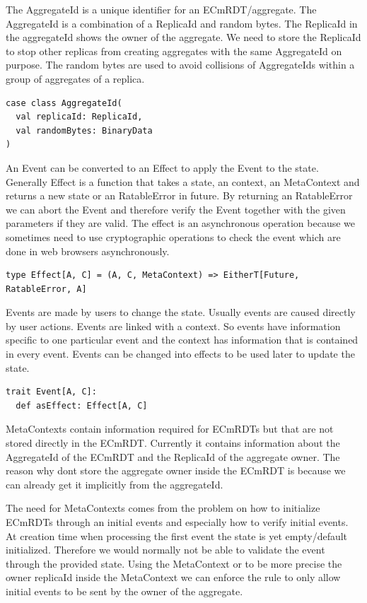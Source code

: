 \documentclass[
	ngerman,
	ruledheaders=section,   %
	class=report,		    %
	thesis={type=bachelor}, %
	accentcolor=9c,			%
	custommargins=true,    %
	marginpar=false,        %
	parskip=half-,          %
	fontsize=11pt,          %
]{tudapub}
\begin{document}
The AggregateId is a unique identifier for an ECmRDT/aggregate. The AggregateId is a combination of a ReplicaId and random bytes. The ReplicaId in the aggregateId shows the owner of the aggregate. We need to store the ReplicaId to stop other replicas from creating aggregates with the same AggregateId on purpose. The random bytes are used to avoid collisions of AggregateIds within a group of aggregates of a replica.

\begin{lstlisting}
case class AggregateId(
  val replicaId: ReplicaId,
  val randomBytes: BinaryData
)
\end{lstlisting}

An Event can be converted to an Effect to apply the Event to the state. Generally Effect is a function that takes a state, an context, an MetaContext and returns a new state or an RatableError in future. By returning an RatableError we can abort the Event and therefore verify the Event together with the given parameters if they are valid. The effect is an asynchronous operation because we sometimes need to use cryptographic operations to check the event which are done in web browsers asynchronously.

\begin{lstlisting}
type Effect[A, C] = (A, C, MetaContext) => EitherT[Future, RatableError, A]
\end{lstlisting}

Events are made by users to change the state. Usually events are caused directly by user actions. Events are linked with a context. So events have information specific to one particular event and the context has information that is contained in every event. Events can be changed into effects to be used later to update the state.

\begin{lstlisting}
trait Event[A, C]:
  def asEffect: Effect[A, C]
\end{lstlisting}

MetaContexts contain information required for ECmRDTs but that are not stored directly in the ECmRDT. Currently it contains information about the AggregateId of the ECmRDT and the ReplicaId of the aggregate owner. The reason why dont store the aggregate owner inside the ECmRDT is because we can already get it implicitly from the aggregateId.

The need for MetaContexts comes from the problem on how to initialize ECmRDTs through an initial events and especially how to verify initial events. At creation time when processing the first event the state is yet empty/default initialized. Therefore we would normally not be able to validate the event through the provided state. Using the MetaContext or to be more precise the owner replicaId inside the MetaContext we can enforce the rule to only allow initial events to be sent by the owner of the aggregate.
\end{document}
